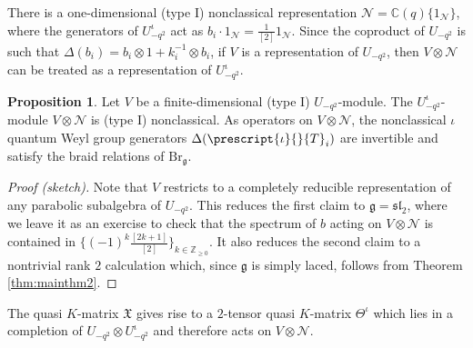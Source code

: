 \documentclass[10pt]{amsart}
\numberwithin{equation}{section}
\theoremstyle{definition}
\newtheorem{prop}[thm]{Proposition}
\def\C{{\mathbb C}}
\newcommand{\Br}{\mathrm{Br}}
\newcommand{\iQW}{\prescript{\iota}{}{T}}
\newcommand{\nctriv}{\mathcal{N}}
\begin{document}
There is a one-dimensional (type I) nonclassical representation $\nctriv=\C(q) \{1_{\nctriv}\}$, 
where the generators of $U_{-q^2}^{\iota}$ act as $b_i\cdot 1_{\nctriv} = \frac{1}{[2]}1_{\nctriv}$. 
Since the coproduct of $U_{-q^2}$ is such that $\Delta(b_i) = b_i\otimes 1 + k_i^{-1}\otimes b_i$, 
if $V$ is a representation of $U_{-q^2}$, 
then $V\otimes \nctriv$ can be treated as a representation of $U_{-q^2}^{\iota}$.

\begin{prop}
Let $V$ be a finite-dimensional (type I) $U_{-q^2}$-module. 
The $U_{-q^2}^{\iota}$-module $V\otimes \nctriv$ is (type I) nonclassical.
As operators on $V\otimes \nctriv$, 
the nonclassical $\iota$quantum Weyl group generators $\Delta(\iQW_i)$ are invertible 
and satisfy the braid relations of $\Br_{\mathfrak{g}}$.
\end{prop}

\begin{proof}[Proof (sketch)]
Note that $V$ restricts to a completely reducible representation of any parabolic subalgebra of $U_{-q^2}$. 
This reduces the first claim to $\mathfrak{g}=\mathfrak{sl}_2$, 
where we leave it as an exercise to check that the spectrum of $b$ 
acting on $V\otimes \mathcal{N}$ is contained in $\{(-1)^k\frac{[2k+1]}{[2]}\}_{k\in \mathbb{Z}_{\ge 0}}$. 
It also reduces the second claim to a nontrivial rank $2$ calculation which, 
since $\mathfrak{g}$ is simply laced, follows from Theorem \ref{thm:mainthm2}.
\end{proof}

The quasi $K$-matrix $\mathfrak{X}$ gives rise to a $2$-tensor quasi $K$-matrix $\Theta^{\iota}$ 
which lies in a completion of $U_{-q^2}\otimes U_{-q^2}^{\iota}$ \cite{BalaKolb, kolb2026shortstarproductsquantum} and therefore acts on $V\otimes \nctriv$.
\end{document}
